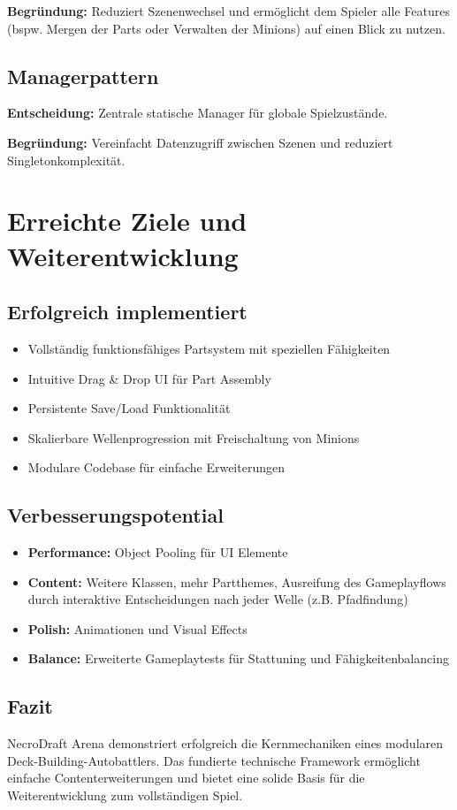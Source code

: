 \textbf{Begründung:} Reduziert Szenenwechsel und ermöglicht dem Spieler alle Features (bspw. Mergen der Parts oder Verwalten der Minions) auf einen Blick zu nutzen.

\subsection{Managerpattern}
\textbf{Entscheidung:} Zentrale statische Manager für globale Spielzustände.

\textbf{Begründung:} Vereinfacht Datenzugriff zwischen Szenen und reduziert Singletonkomplexität.

\section{Erreichte Ziele und Weiterentwicklung}

\subsection{Erfolgreich implementiert}
\begin{itemize}
    \item Vollständig funktionsfähiges Partsystem mit speziellen Fähigkeiten
    \item Intuitive Drag \& Drop UI für Part Assembly
    \item Persistente Save/Load Funktionalität
    \item Skalierbare Wellenprogression mit Freischaltung von Minions
    \item Modulare Codebase für einfache Erweiterungen
\end{itemize}

\subsection{Verbesserungspotential}
\begin{itemize}
    \item \textbf{Performance:} Object Pooling für UI Elemente
    \item \textbf{Content:} Weitere Klassen, mehr Partthemes, Ausreifung des Gameplayflows durch interaktive Entscheidungen nach jeder Welle (z.B. Pfadfindung)
    \item \textbf{Polish:} Animationen und Visual Effects
    \item \textbf{Balance:} Erweiterte Gameplaytests für Stattuning und Fähigkeitenbalancing
\end{itemize}

\subsection{Fazit}
NecroDraft Arena demonstriert erfolgreich die Kernmechaniken eines modularen Deck-Building-Autobattlers. 
Das fundierte technische Framework ermöglicht einfache Contenterweiterungen und bietet eine solide Basis für die Weiterentwicklung zum vollständigen Spiel.
